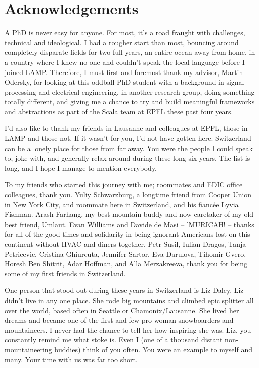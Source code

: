 \chapter*{Acknowledgements}

\vspace{0.5cm}
A PhD is never easy for anyone. For most, it's a road fraught with challenges,
technical and ideological. I had a rougher start than most, bouncing around
completely disparate fields for two full years, an entire ocean away from home,
in a country where I knew no one and couldn't speak the local language before I
joined LAMP. Therefore, I must first and foremost thank my advisor, Martin
Odersky, for looking at this oddball PhD student with a background in signal
processing and electrical engineering, in another research group, doing
something totally different, and giving me a chance to try and build meaningful
frameworks and abstractions as part of the Scala team at EPFL these past four
years.

\vspace{0.5cm}
I'd also like to thank my friends in Lausanne and colleagues at EPFL, those in
LAMP and those not. If it wasn't for you, I'd not have gotten here. Switzerland
can be a lonely place for those from far away. You were the people I could speak
to, joke with, and generally relax around during these long six years. The list
is long, and I hope I manage to mention everybody.

\vspace{0.5cm}
To my friends who started this journey with me; roommates and EDIC office
colleagues, thank you. Yuliy Schwarzburg, a longtime friend from Cooper Union in
New York City, and roommate here in Switzerland, and his fianc\'{e}e Lyvia
Fishman. Arash Farhang, my best mountain buddy and now caretaker of my old best
friend, Umlaut. Evan Williams and Davide de Masi -- 'MURICAH! -- thanks for all
of the good times and solidarity in being ignorant Americans lost on this
continent without HVAC and diners together. Petr Susil, Iulian Dragos, Tanja
Petricevic, Cristina Ghiurcuta, Jennifer Sartor, Eva Darulova, Tihomir Gvero,
Horesh Ben Shitrit, Adar Hoffman, and Alla Merzakreeva, thank you for being some
of my first friends in Switzerland.

\vspace{0.5cm}
One person that stood out during these years in Switzerland is Liz Daley. Liz
didn't live in any one place. She rode big mountains and climbed epic splitter
all over the world, based often in Seattle or Chamonix/Lausanne. She lived her
dreams and became one of the first and few pro woman snowboarders and
mountaineers. I never had the chance to tell her how inspiring she was. Liz, you
constantly remind me what stoke is. Even I (one of a thousand distant
non-mountaineering buddies) think of you often. You were an example to myself
and many. Your time with us was far too short.

